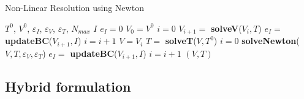 \begin{algorithm}[H]
  \caption{Non-Linear Resolution using Newton}
  \label{algo:et-newton}
  \begin{algorithmic}
    \REQUIRE $T^0$, $V^0$, $\varepsilon_I$, $\varepsilon_V$, $\varepsilon_T$,
    $N_{max}$
    \ENSURE $I$
    \STATE $e_I=0$
    \STATE $V_0=V^0$
    \STATE $i=0$
    \vspace{0.3cm}
    \REPEAT
      \STATE $V_{i+1} =$ \textbf{solveV}($V_i,T$)
        \STATE $e_I =$ \textbf{updateBC}($V_{i+1},I$)
      \ENDIF
      \STATE $i=i+1$
    \STATE $V=V_i$
    \STATE $T =$ \textbf{solveT}($V,T^0$)
    \STATE $i=0$
    \REPEAT
    \STATE \textbf{solveNewton}($V,T,\varepsilon_V,\varepsilon_T$)
        \STATE $e_I =$ \textbf{updateBC}($V_{i+1},I$)
      \ENDIF
      \STATE $i=i+1$
    \RETURN $(V,T)$
  \end{algorithmic}
\end{algorithm}

\subsection{Hybrid formulation}

